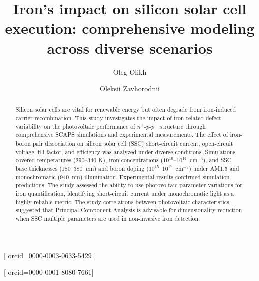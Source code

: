 \documentclass[a4paper,fleqn]{cas-sc}
\begin{document}
\let\WriteBookmarks\relax
\def\floatpagepagefraction{1}
\def\textpagefraction{.001}



\title [mode = title]{Iron's impact on silicon solar cell execution: comprehensive modeling across diverse scenarios}

\author{Oleg Olikh}[
       orcid=0000-0003-0633-5429
       ]

\cormark[1]







\author{Oleksii Zavhorodnii}[
       orcid=0000-0001-8080-7661]





\begin{abstract}
Silicon solar cells are vital for renewable energy but often degrade from iron-induced carrier recombination.
This study investigates the impact of iron-related defect variability on the photovoltaic performance of $n^+$-$p$-$p^+$ structure
through comprehensive SCAPS simulations and experimental measurements.
The effect of iron-boron pair dissociation on  silicon solar cell (SSC) short-circuit current, open-circuit voltage, fill factor, and efficiency was analyzed under diverse conditions.
Simulations covered temperatures (290–340 K), iron concentrations ($10^{10}$--$10^{14}$~cm$^{-3}$), and SSC base thicknesses (180--380~$\mu$m) and boron doping ($10^{15}$--$10^{17}$~cm$^{-3}$) under AM1.5 and monochromatic (940~nm) illumination.
Experimental results confirmed simulation predictions.
The study assessed the ability to use photovoltaic parameter variations for iron quantification, identifying short-circuit current under monochromatic light as a highly reliable metric.
The study correlations between photovoltaic characteristics suggested that Principal Component Analysis is advisable for dimensionality reduction
when SSC multiple parameters are used in non-invasive iron detection.
\end{abstract}
\end{document}
